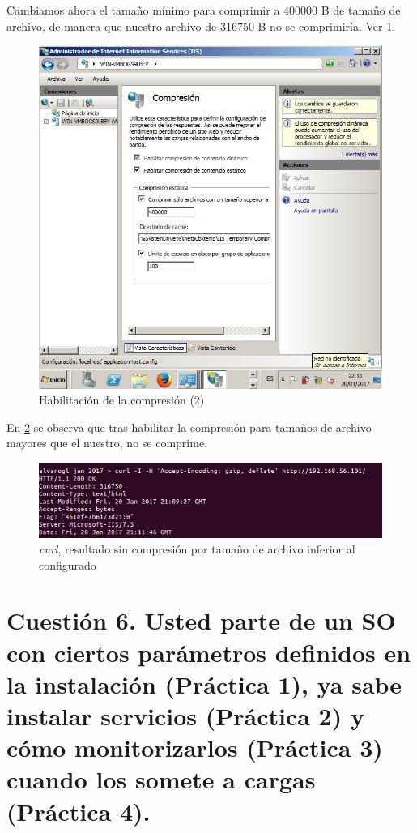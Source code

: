 Cambiamos ahora el tamaño mínimo para comprimir a 400000 B de tamaño de archivo, de manera que nuestro archivo de 316750 B no se comprimiría. Ver \ref{15}.

\begin{figure}[H]
	\centering
	\includegraphics[scale=0.45]{15.png}
	\caption{Habilitación de la compresión (2) } \label{15}
\end{figure}

En \ref{16} se observa que tras habilitar la compresión para tamaños de archivo mayores que el nuestro, no se comprime.

\begin{figure}[H]
	\centering
	\includegraphics[scale=0.6]{16.png}
	\caption{\textit{curl}, resultado sin compresión por tamaño de archivo inferior al configurado} \label{16}
\end{figure}

\section{Cuestión 6. Usted parte de un SO con ciertos parámetros definidos en la instalación (Práctica 1), ya sabe instalar servicios (Práctica 2) y cómo monitorizarlos (Práctica 3) cuando los somete a cargas (Práctica 4).} 

